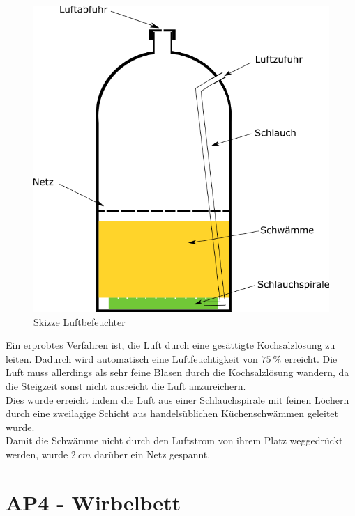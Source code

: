 \begin{figure}[h]
	\begin{center}
		\includegraphics[scale=0.6]{Luftbefeuchter.png}
		\caption{Skizze Luftbefeuchter}
	\end{center}
\end{figure}

Ein erprobtes Verfahren ist, die Luft durch eine gesättigte Kochsalzlösung zu leiten. Dadurch wird automatisch eine Luftfeuchtigkeit von $\SI{75}{\%}$ erreicht. Die Luft muss allerdings als sehr feine Blasen durch die Kochsalzlösung wandern, da die Steigzeit sonst nicht ausreicht die Luft anzureichern. \\
Dies wurde erreicht indem die Luft aus einer Schlauchspirale mit feinen Löchern durch eine zweilagige Schicht aus handelsüblichen Küchenschwämmen geleitet wurde. \\
Damit die Schwämme nicht durch den Luftstrom von ihrem Platz weggedrückt werden, wurde $\SI{2}{cm}$ darüber ein Netz gespannt.

\newpage

\section{AP4 - Wirbelbett}


